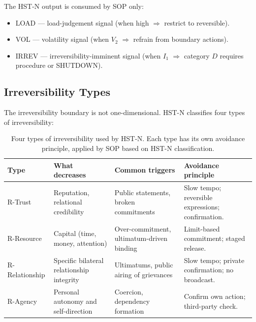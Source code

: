 The HST-N output is consumed by SOP only:

\begin{itemize}
\item LOAD --- load-judgement signal (when high $\Rightarrow$
restrict to reversible).
\item VOL --- volatility signal (when $V_2$ $\Rightarrow$ refrain
from boundary actions).
\item IRREV --- irreversibility-imminent signal (when $I_1$
$\Rightarrow$ category $D$ requires procedure or SHUTDOWN).
\end{itemize}


\subsection{Irreversibility Types}
\label{sec:hstn-irreversible-types-c2}

The irreversibility boundary is not one-dimensional. HST-N
classifies four types of irreversibility:

\begin{table}[ht]
\centering
\small
\begin{tabularx}{\linewidth}{lXXX}
\toprule
\textbf{Type} & \textbf{What decreases} & \textbf{Common triggers} & \textbf{Avoidance principle} \\
\midrule
R-Trust
& Reputation, relational credibility
& Public statements, broken commitments
& Slow tempo; reversible expressions; confirmation. \\

R-Resource
& Capital (time, money, attention)
& Over-commitment, ultimatum-driven binding
& Limit-based commitment; staged release. \\

R-Relationship
& Specific bilateral relationship integrity
& Ultimatums, public airing of grievances
& Slow tempo; private confirmation; no broadcast. \\

R-Agency
& Personal autonomy and self-direction
& Coercion, dependency formation
& Confirm own action; third-party check. \\
\bottomrule
\end{tabularx}
\caption[Irreversibility types]{Four types of irreversibility used
by HST-N. Each type has its own avoidance principle, applied by
SOP based on HST-N classification.}
\label{tab:hstn-irreversibility-types-c2}
\end{table}

